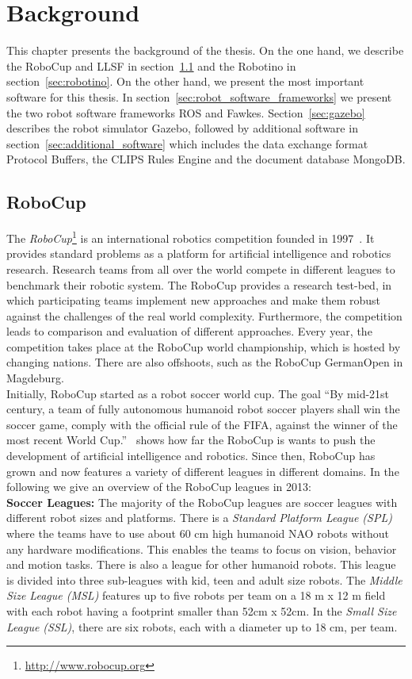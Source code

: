 \chapter{Background}
\label{cha:background}
This chapter presents the background of the thesis. On the one hand, we describe the RoboCup and LLSF in section~\ref{sec:robocup} and the Robotino in section~\ref{sec:robotino}. On the other hand, we present the most important software for this thesis. In section~\ref{sec:robot_software_frameworks} we present the two robot software frameworks ROS and Fawkes. Section~\ref{sec:gazebo} describes the robot simulator Gazebo, followed by additional software in section~\ref{sec:additional_software} which includes the data exchange format Protocol Buffers, the CLIPS Rules Engine and the document database MongoDB.

\section{RoboCup}
\label{sec:robocup}
The \textit{RoboCup}\footnote{\url{http://www.robocup.org}} is an international robotics competition founded in 1997~\cite{Robocup}. It provides standard problems as a platform for artificial intelligence and robotics research. Research teams from all over the world compete in different leagues to benchmark their robotic system. The RoboCup provides a research test-bed, in which participating teams implement new approaches and make them robust against the challenges of the real world complexity. Furthermore, the competition leads to comparison and evaluation of different approaches. Every year, the competition takes place at the RoboCup world championship, which is hosted by changing nations. There are also offshoots, such as the RoboCup GermanOpen in Magdeburg.\\
Initially, RoboCup started as a robot soccer world cup. The goal ``By mid-21st century, a team of fully autonomous humanoid robot soccer players shall win the soccer game, comply with the official rule of the FIFA, against the winner of the most recent World Cup.''~\cite{robocup_goal} shows how far the RoboCup is wants to push the development of artificial intelligence and robotics. Since then, RoboCup has grown and now features a variety of different leagues in different domains. In the following we give an overview of the RoboCup leagues in 2013:\\
\textbf{Soccer Leagues:} The majority of the RoboCup leagues are soccer leagues with different robot sizes and platforms. There is a \textit{Standard Platform League (SPL)} where the teams have to use about 60 cm high humanoid NAO robots without any hardware modifications. This enables the teams to focus on vision, behavior and motion tasks. There is also a league for other humanoid robots. This league is divided into three sub-leagues with kid, teen and adult size robots. The \textit{Middle Size League (MSL)} features up to five robots per team on a 18 m x 12 m field with each robot having a footprint smaller than 52cm x 52cm. In the \textit{Small Size League (SSL)}, there are six robots, each with a diameter up to 18 cm, per team.\\
